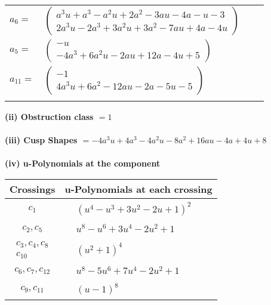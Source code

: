 \documentclass[1p]{elsarticle_modified}
\theoremstyle{definition}
\begin{document}
\begin{tabular}{m{7pt} m{180pt} m{7pt} m{180pt} }
\flushright $a_{6}=$&$\begin{pmatrix}a^3 u+a^3- a^2 u+2 a^2-3 a u-4 a- u-3\\2 a^3 u-2 a^3+3 a^2 u+3 a^2-7 a u+4 a-4 u\end{pmatrix}$ \\
\flushright $a_{5}=$&$\begin{pmatrix}- u\\-4 a^3+6 a^2 u-2 a u+12 a-4 u+5\end{pmatrix}$ \\
\flushright $a_{11}=$&$\begin{pmatrix}-1\\4 a^3 u+6 a^2-12 a u-2 a-5 u-5\end{pmatrix}$\\&\end{tabular}
\flushleft \textbf{(ii) Obstruction class $= 1$}\\~\\
\flushleft \textbf{(iii) Cusp Shapes $= -4 a^3 u+4 a^3-4 a^2 u-8 a^2+16 a u-4 a+4 u+8$}\\~\\
\newpage\renewcommand{\arraystretch}{1}
\flushleft \textbf{(iv) u-Polynomials at the component}\newline \\
\begin{tabular}{m{50pt}|m{274pt}}
Crossings & \hspace{64pt}u-Polynomials at each crossing \\
\hline $$\begin{aligned}c_{1}\end{aligned}$$&$\begin{aligned}
&(u^4- u^3+3 u^2-2 u+1)^2
\end{aligned}$\\
\hline $$\begin{aligned}c_{2},c_{5}\end{aligned}$$&$\begin{aligned}
&u^8- u^6+3 u^4-2 u^2+1
\end{aligned}$\\
\hline $$\begin{aligned}c_{3},c_{4},c_{8}\\c_{10}\end{aligned}$$&$\begin{aligned}
&(u^2+1)^4
\end{aligned}$\\
\hline $$\begin{aligned}c_{6},c_{7},c_{12}\end{aligned}$$&$\begin{aligned}
&u^8-5 u^6+7 u^4-2 u^2+1
\end{aligned}$\\
\hline $$\begin{aligned}c_{9},c_{11}\end{aligned}$$&$\begin{aligned}
&(u-1)^8
\end{aligned}$\\
\hline
\end{tabular}\\~\\
\end{document}
